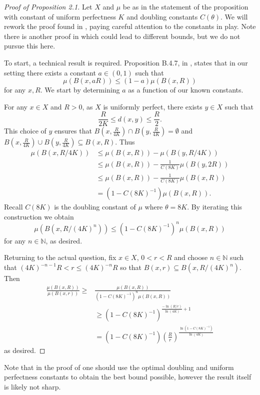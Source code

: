 \begin{proof}[Proof of Proposition 2.1]
	Let $X$ and $\mu$ be as in the statement of the proposition with constant of uniform perfectness $K$ and doubling constants $C(\theta)$. We will rework the proof found in \cite[lemma 3.1]{anti1}, paying careful attention to the constants in play. Note there is another proof in \cite[Lemma 4.5]{eino-pablo} which could lead to different bounds, but we do not pursue this here.
	
	To start, a technical result is required. Proposition B.4.7, in \cite{gromov}, states that in our setting there exists a constant $a \in (0,1)$ such that 
	\[
	\mu(B(x,aR)) \le (1-a) \mu(B(x,R))
	\]
	for any $x,R$. We start by determining $a$ as a function of our known constants. 
	
	For any $x\in X$ and $R>0$, as $X$ is uniformly perfect, there exists $y \in X$ such that $$\frac{R}{2K} \le d(x,y) \le \frac{R}{2}.$$ This choice of $y$ ensures that $B(x,\frac{R}{4K}) \cap B(y,\frac{R}{4K}) = \emptyset $ and $B(x,\frac{R}{4K}) \cup B(y,\frac{R}{4K}) \subseteq B(x,R)$. Thus
	\begin{align*}
	\mu(B(x,R/4K)) &\le \mu(B(x,R)) - \mu(B(y, R/4K))\\
	& \le \mu(B(x,R)) - \frac{1}{C(8K)}\mu(B(y,2R)) \\
	& \le \mu(B(x,R)) - \frac{1}{C(8K)}\mu(B(x,R)) \\
	& = (1-C(8K)^{-1}) \mu(B(x,R)).
	\end{align*}
	Recall $C(8K)$ is the doubling constant of $\mu$ where $\theta = 8K$. By iterating this construction we obtain
	\[
	\mu(B(x,R/(4K)^n)) \le (1-C(8K)^{-1})^n \mu(B(x,R))
	\]
	for any $n\in \mathbb{N}$, as desired.
	
	Returning to the actual question, fix $x\in X$, $0 < r < R$ and choose $n\in \mathbb{N}$ such that $(4K)^{-n-1}R < r \le (4K)^{-n}R$ so that $B(x,r) \subseteq B(x,R/(4K)^{n})$. Then
	\begin{align*}
	\frac{\mu(B(x,R))}{\mu(B(x,r))} \ge& \frac{\mu(B(x,R))}{(1-C(8K)^{-1})^n\mu(B(x,R))} \\
	& \ge (1-C(8K)^{-1})^{\frac{-\ln(R/r)}{\ln(4K)} + 1}\\
	& = (1-C(8K)^{-1})\left(\frac{R}{r}\right)^{\frac{\ln(1-C(8K)^{-1})}{\ln(4K)}}
	\end{align*}
	as desired.
	
\end{proof}

Note that in the proof of \cite{gromov} one should use the optimal doubling and uniform perfectness constants to obtain the best bound possible, however the result itself is likely not sharp.

